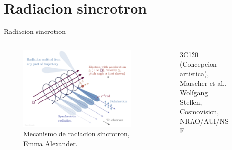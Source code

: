 \documentclass[xetex,aspectratio=169]{beamer}
\begin{document}
	\section{Radiacion sincrotron}
	\begin{frame}{Radiacion sincrotron}
		\begin{columns}
			
			\begin{column}{0.48\textwidth}
				\begin{figure}
					\includegraphics[width=\textwidth, keepaspectratio]{./figures/synchrotron/synchrotron.png}
					\caption*{Mecanismo de radiacion sincrotron, Emma Alexander.}
				\end{figure}
			\end{column}
			
			\begin{column}{0.48\textwidth}
				\begin{figure}
					\caption*{3C120 (Concepcion artistica), Marscher et al., Wolfgang Steffen, Cosmovision, NRAO/AUI/NSF}
				\end{figure}
				
				
			\end{column}
		\end{columns}
	\end{frame}
	
\end{document}
